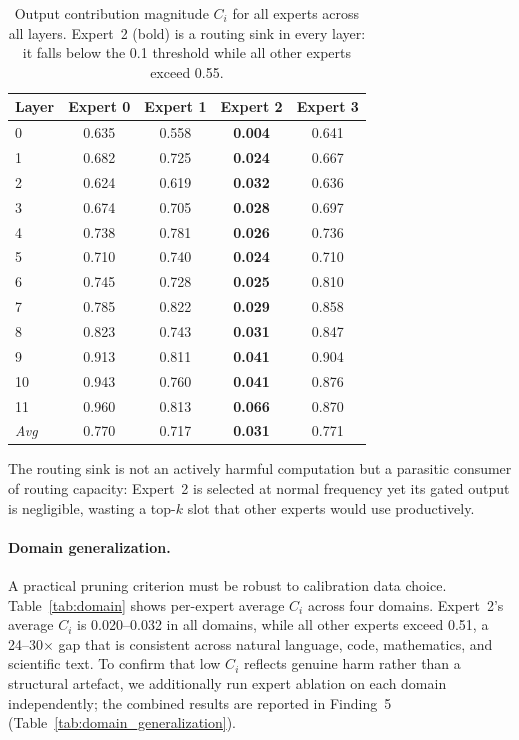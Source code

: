 \documentclass{article}
\begin{document}
\begin{table}[t]
\caption{Output contribution magnitude $C_i$ for all experts across all layers. Expert~2 (bold) is a routing sink in every layer: it falls below the 0.1 threshold while all other experts exceed 0.55.}
\label{tab:ci}
\centering
\small
\begin{tabular}{lcccc}
\toprule
\textbf{Layer} & \textbf{Expert 0} & \textbf{Expert 1} & \textbf{Expert 2} & \textbf{Expert 3} \\
\midrule
0  & 0.635 & 0.558 & \textbf{0.004} & 0.641 \\
1  & 0.682 & 0.725 & \textbf{0.024} & 0.667 \\
2  & 0.624 & 0.619 & \textbf{0.032} & 0.636 \\
3  & 0.674 & 0.705 & \textbf{0.028} & 0.697 \\
4  & 0.738 & 0.781 & \textbf{0.026} & 0.736 \\
5  & 0.710 & 0.740 & \textbf{0.024} & 0.710 \\
6  & 0.745 & 0.728 & \textbf{0.025} & 0.810 \\
7  & 0.785 & 0.822 & \textbf{0.029} & 0.858 \\
8  & 0.823 & 0.743 & \textbf{0.031} & 0.847 \\
9  & 0.913 & 0.811 & \textbf{0.041} & 0.904 \\
10 & 0.943 & 0.760 & \textbf{0.041} & 0.876 \\
11 & 0.960 & 0.813 & \textbf{0.066} & 0.870 \\
\midrule
\textit{Avg} & 0.770 & 0.717 & \textbf{0.031} & 0.771 \\
\bottomrule
\end{tabular}
\end{table}

The routing sink is not an actively harmful computation but a parasitic consumer of routing capacity: Expert~2 is selected at normal frequency yet its gated output is negligible, wasting a top-$k$ slot that other experts would use productively.

\paragraph{Domain generalization.}
A practical pruning criterion must be robust to calibration data choice. Table~\ref{tab:domain} shows per-expert average $C_i$ across four domains. Expert~2's average $C_i$ is 0.020--0.032 in all domains, while all other experts exceed 0.51, a 24--30$\times$ gap that is consistent across natural language, code, mathematics, and scientific text. To confirm that low $C_i$ reflects genuine harm rather than a structural artefact, we additionally run expert ablation on each domain independently; the combined results are reported in Finding~5 (Table~\ref{tab:domain_generalization}).
\end{document}
